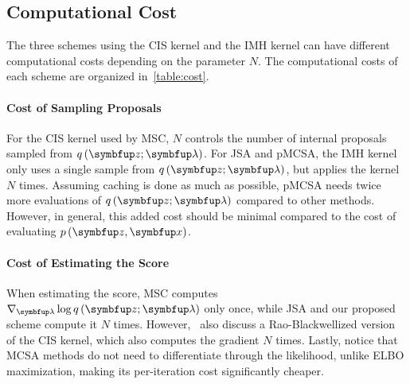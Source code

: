 \begin{wraptable}{r}{0.55\textwidth}
  \centering
  \vspace{-0.75in}
  
  \vspace{-0.2in}
\end{wraptable}
%
\subsection{Computational Cost}
The three schemes using the CIS kernel and the IMH kernel can have different computational costs depending on the parameter \(N\).
The computational costs of each scheme are organized in~\cref{table:cost}.

\vspace{-0.05in}
\paragraph{Cost of Sampling Proposals}
For the CIS kernel used by MSC, \(N\) controls the number of internal proposals sampled from \(q\,(\vz; \vlambda)\).
For JSA and pMCSA, the IMH kernel only uses a single sample from \(q\,(\vz; \vlambda)\), but applies the kernel \(N\) times.
Assuming caching is done as much as possible, pMCSA needs twice more evaluations of \(q\,(\vz; \vlambda)\) compared to other methods.
However, in general, this added cost should be minimal compared to the cost of evaluating \(p\,(\vz,\vx)\).

\vspace{-0.05in}
\paragraph{Cost of Estimating the Score}
When estimating the score, MSC computes \(\nabla_{\vlambda} \log q\,(\vz; \vlambda)\) only once, while JSA and our proposed scheme compute it \(N\) times.
However,~\cite{NEURIPS2020_b2070693} also discuss a Rao-Blackwellized version of the CIS kernel, which also computes the gradient \(N\) times.
Lastly, notice that MCSA methods do not need to differentiate through the likelihood, unlike ELBO maximization, making its per-iteration cost significantly cheaper.

